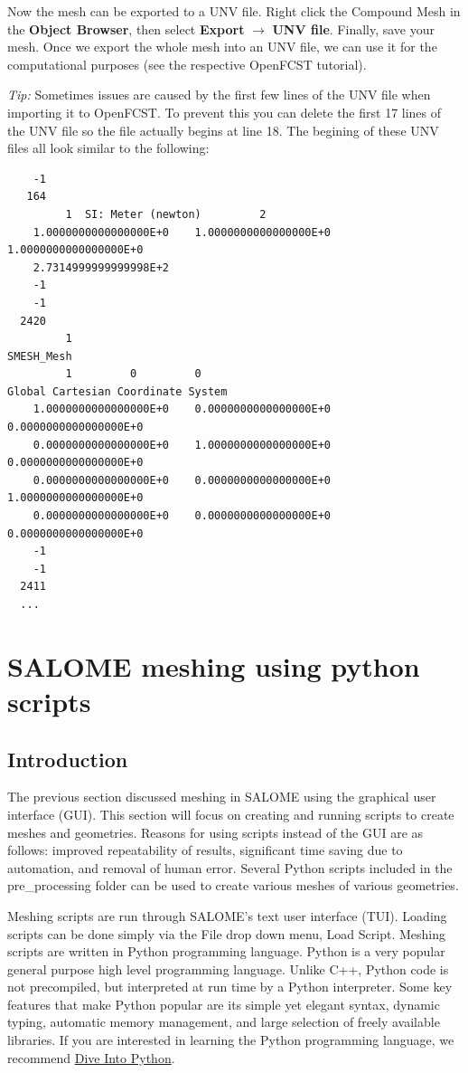 Now the mesh can be exported to a UNV file. Right click the Compound Mesh in the \textbf{Object Browser}, then select \textbf{Export} $\rightarrow$ \textbf{UNV file}. Finally, save your mesh. Once we export the whole mesh into an UNV file, we can use it for the computational purposes (see the respective OpenFCST tutorial).

\textit{Tip:} Sometimes issues are caused by the first few lines of the UNV file when importing it to OpenFCST. To prevent this you can delete the first 17 lines of the UNV file so the file actually begins at line 18. The begining of these UNV files all look similar to the following:

\begin{lstlisting}
    -1
   164
         1  SI: Meter (newton)         2
    1.0000000000000000E+0    1.0000000000000000E+0    1.0000000000000000E+0
    2.7314999999999998E+2
    -1
    -1
  2420
         1
SMESH_Mesh
         1         0         0
Global Cartesian Coordinate System
    1.0000000000000000E+0    0.0000000000000000E+0    0.0000000000000000E+0
    0.0000000000000000E+0    1.0000000000000000E+0    0.0000000000000000E+0
    0.0000000000000000E+0    0.0000000000000000E+0    1.0000000000000000E+0
    0.0000000000000000E+0    0.0000000000000000E+0    0.0000000000000000E+0
    -1
    -1
  2411
  ...
\end{lstlisting}
  
\section{SALOME meshing using python scripts}

\subsection{Introduction}

The previous section discussed meshing in SALOME using the graphical user interface (GUI). This section will focus on creating and running scripts to create meshes and geometries. Reasons for using scripts 
instead of the GUI are as follows: improved repeatability of results, significant time saving due to automation, and removal of human error. Several Python scripts included in the pre\_processing
folder can be used to create various meshes of various geometries.

Meshing scripts are run through SALOME's text user interface (TUI). Loading scripts can be done simply via the File drop down menu, Load Script. Meshing scripts are written in Python programming language.
Python is a very popular general purpose high level programming language. Unlike C++, Python code is not precompiled, but interpreted at run time by a Python interpreter. Some key features
that make Python popular are its simple yet elegant syntax, dynamic typing, automatic memory management, and large selection of freely available libraries. If you are interested in
learning the Python programming language, we recommend \href{http://www.diveintopython.net/}{Dive Into Python}.

